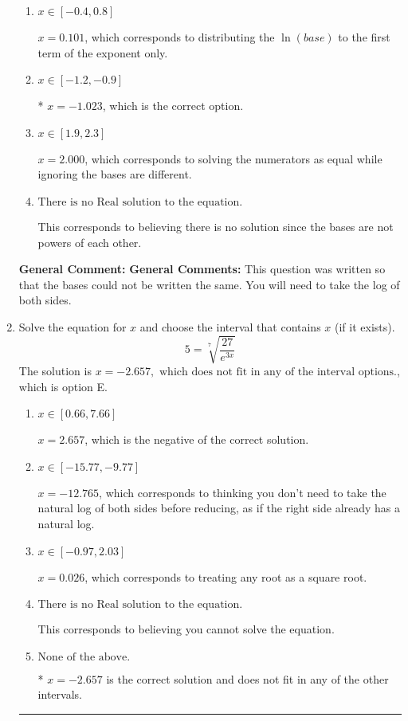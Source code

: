 \documentclass{extbook}[14pt]
\newcommand{\litem}[1]{\item #1

\rule{\textwidth}{0.4pt}}
\begin{document}
\begin{enumerate}
{\begin{enumerate}[label=\Alph*.]
$x = -20.253$, which corresponds to distributing the $\ln(base)$ to the second term of the exponent only.
\item \( x \in [-0.4, 0.8] \)

$x = 0.101$, which corresponds to distributing the $\ln(base)$ to the first term of the exponent only.
\item \( x \in [-1.2, -0.9] \)

* $x = -1.023$, which is the correct option.
\item \( x \in [1.9, 2.3] \)

$x = 2.000$, which corresponds to solving the numerators as equal while ignoring the bases are different.
\item \( \text{There is no Real solution to the equation.} \)

This corresponds to believing there is no solution since the bases are not powers of each other.
\end{enumerate}

\textbf{General Comment:} \textbf{General Comments:} This question was written so that the bases could not be written the same. You will need to take the log of both sides.
}
\litem{
 Solve the equation for $x$ and choose the interval that contains $x$ (if it exists).
\[  5 = \sqrt[7]{\frac{27}{e^{3x}}} \]The solution is \( x = -2.657, \text{ which does not fit in any of the interval options.} \), which is option E.\begin{enumerate}[label=\Alph*.]
\item \( x \in [0.66, 7.66] \)

$x = 2.657$, which is the negative of the correct solution.
\item \( x \in [-15.77, -9.77] \)

$x = -12.765$, which corresponds to thinking you don't need to take the natural log of both sides before reducing, as if the right side already has a natural log.
\item \( x \in [-0.97, 2.03] \)

$x = 0.026$, which corresponds to treating any root as a square root.
\item \( \text{There is no Real solution to the equation.} \)

This corresponds to believing you cannot solve the equation.
\item \( \text{None of the above.} \)

* $x = -2.657$ is the correct solution and does not fit in any of the other intervals.
\end{enumerate}

}
\end{enumerate}
\end{document}
